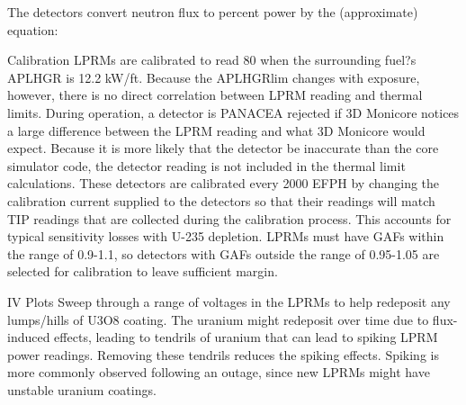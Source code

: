 \documentclass[10pt]{article}
\begin{document}
The detectors convert neutron flux to percent power by the (approximate) equation:



Calibration
LPRMs are calibrated to read 80 when the surrounding fuel?s APLHGR is 12.2 kW/ft. Because the APLHGRlim changes with exposure, however, there is no direct correlation between LPRM reading and thermal limits. During operation, a detector is PANACEA rejected if 3D Monicore notices a large difference between the LPRM reading and what 3D Monicore would expect. Because it is more likely that the detector be inaccurate than the core simulator code, the detector reading is not included in the thermal limit calculations. These detectors are calibrated every 2000 EFPH by changing the calibration current supplied to the detectors so that their readings will match TIP readings that are collected during the calibration process. This accounts for typical sensitivity losses with U-235 depletion. LPRMs must have GAFs within the range of 0.9-1.1, so detectors with GAFs outside the range of 0.95-1.05 are selected for calibration to leave sufficient margin. 

IV Plots
Sweep through a range of voltages in the LPRMs to help redeposit any lumps/hills of U3O8 coating. The uranium might redeposit over time due to flux-induced effects, leading to tendrils of uranium that can lead to spiking LPRM power readings. Removing these tendrils reduces the spiking effects. Spiking is more commonly observed following an outage, since new LPRMs might have unstable uranium coatings. 
\end{document}
